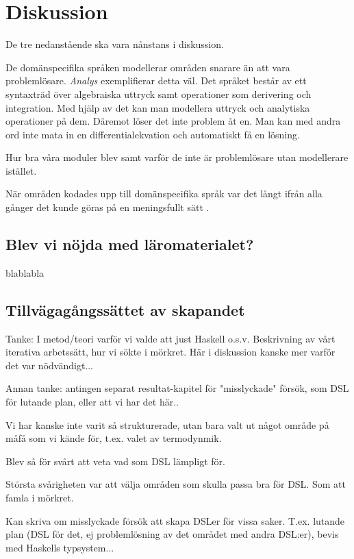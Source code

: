 
\chapter{Diskussion}

\begin{binge}
De tre nedanstående ska vara nånstans i diskussion.

De domänspecifika språken modellerar områden snarare än att vara problemlösare. \textit{Analys} exemplifierar detta väl. Det språket består av ett syntaxträd över algebraiska uttryck samt operationer som derivering och integration. Med hjälp av det kan man modellera uttryck och analytiska operationer på dem. Däremot löser det inte problem åt en. Man kan med andra ord inte mata in en differentialekvation och automatiskt få en lösning.

Hur bra våra moduler blev samt varför de inte är problemlösare utan modellerare istället.

När områden kodades upp till domänspecifika språk var det långt ifrån alla gånger
det kunde göras på en meningsfullt sätt . 

\section{Blev vi nöjda med läromaterialet?}

blablabla

\section{Tillvägagångssättet av skapandet}

Tanke: I metod/teori varför vi valde att just Haskell o.s.v. Beskrivning av
vårt iterativa arbetssätt, hur vi sökte i mörkret. Här i diskussion kanske mer
varför det var nödvändigt...

Annan tanke: antingen separat resultat-kapitel för "misslyckade" försök, som
DSL för lutande plan, eller att vi har det här..

Vi har kanske inte varit så strukturerade, utan bara valt ut något område på
måfå som vi kände för, t.ex. valet av termodynmik.

Blev så för svårt att veta vad som DSL lämpligt för.

Största svårigheten var att välja områden som skulla passa bra för DSL. Som att
famla i mörkret.

Kan skriva om misslyckade försök att skapa DSLer för vissa saker. T.ex. lutande plan (DSL för det, ej problemlösning av det området med andra DSL:er), bevis med Haskells typsystem...


\end{binge}
